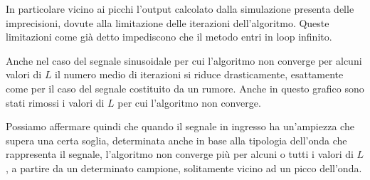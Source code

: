 		In particolare vicino ai picchi l'output calcolato dalla simulazione presenta delle imprecisioni, dovute alla limitazione delle iterazioni dell'algoritmo. Queste limitazioni come già detto impediscono che il metodo entri in loop infinito.
	
		Anche nel caso del segnale sinusoidale per cui l'algoritmo non converge per alcuni valori di $L$ il numero medio di iterazioni si riduce drasticamente, esattamente come per il caso del segnale costituito da un rumore. Anche in questo grafico sono stati rimossi i valori di $L$ per cui l'algoritmo non converge.
	
		\graficospace
	
		Possiamo affermare quindi che quando il segnale in ingresso ha un'ampiezza che supera una certa soglia, determinata anche in base alla tipologia dell'onda che rappresenta il segnale, l'algoritmo non converge più per alcuni o tutti i valori di $L$, a partire da un determinato campione, solitamente vicino ad un picco dell'onda.